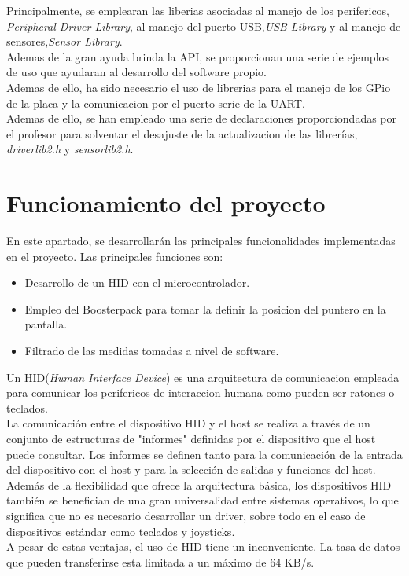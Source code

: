 \documentclass[a4paper,twoside]{article}
\begin{document}
Principalmente, se emplearan las liberias asociadas al manejo de los perifericos, \textit{Peripheral Driver Library}, al manejo del puerto USB,\textit{USB Library} y al manejo de sensores,\textit{Sensor Library}. \\
Ademas de la gran ayuda brinda la API, se proporcionan una serie de ejemplos de uso que ayudaran al desarrollo del software propio. \\

Ademas de ello, ha sido necesario el uso de librerias para el manejo de los GPio de la placa y la comunicacion por el puerto serie de la UART. \\
Ademas de ello, se han empleado una serie de declaraciones proporciondadas por el profesor para solventar el desajuste de la actualizacion de las librerías, \textit{driverlib2.h} y \textit{sensorlib2.h}.

\newpage
\section{Funcionamiento del proyecto}
En este apartado, se desarrollarán las principales funcionalidades implementadas en el proyecto. Las principales funciones son:
\begin{itemize}
\item Desarrollo de un HID con el microcontrolador.
\item Empleo del Boosterpack para tomar la definir la posicion del puntero en la pantalla.
\item Filtrado de las medidas tomadas a nivel de software.
\end{itemize}

Un HID(\textit{Human Interface Device}) es una arquitectura de comunicacion empleada para comunicar los perifericos de interaccion humana como pueden ser ratones o teclados.\\
La comunicación entre el dispositivo HID y el host se realiza a través de un conjunto de estructuras de "informes" definidas por el dispositivo que el host puede consultar. Los informes se definen tanto para la comunicación de la entrada del dispositivo con el host y para la selección de salidas y funciones del host. \\

Además de la flexibilidad que ofrece la arquitectura básica, los dispositivos HID también se benefician de una gran universalidad entre sistemas operativos, lo que significa que no es necesario desarrollar un driver, sobre todo en el caso de dispositivos estándar como teclados y joysticks.\\
A pesar de estas ventajas, el uso de HID tiene un inconveniente. La tasa de datos que pueden transferirse esta limitada a un máximo de 64 KB/s.\\
\end{document}
